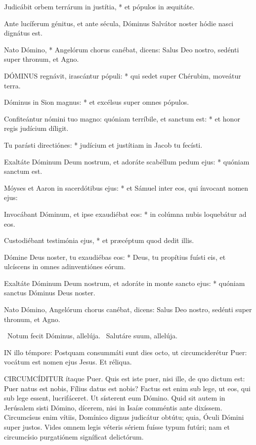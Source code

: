 Judicábit orbem terrárum in justítia, * et pópulos in æquitáte.

 Ante lucíferum génitus, et ante sécula, Dóminus Salvátor noster hódie nasci dignátus est.

 Nato Dómino, * Angelórum chorus canébat, dicens: Salus Deo nostro, sedénti super thronum, et Agno.


\lettrine[lines=2]{D}{ÓMINUS} regnávit, irascántur pópuli: * qui sedet super Chérubim, moveátur terra.

Dóminus in Sion magnus: * et excélsus super omnes pópulos.

Confiteántur nómini tuo magno: quóniam terríbile, et sanctum est: * et honor regis judícium díligit.

Tu parásti directiónes: * judícium et justítiam in Jacob tu fecísti.

Exaltáte Dóminum Deum nostrum, et adoráte scabéllum pedum ejus: * quóniam sanctum est.

Móyses et Aaron in sacerdótibus ejus: * et Sámuel inter eos, qui ínvocant nomen ejus:

Invocábant Dóminum, et ipse exaudiébat eos: * in colúmna nubis loquebátur ad eos.

Custodiébant testimónia ejus, * et præcéptum quod dedit illis.

Dómine Deus noster, tu exaudiébas eos: * Deus, tu propítius fuísti eis, et ulcíscens in omnes adinventiónes eórum.

Exaltáte Dóminum Deum nostrum, et adoráte in monte sancto ejus: * quóniam sanctus Dóminus Deus noster.

 Nato Dómino, Angelórum chorus canébat, dicens: Salus Deo nostro, sedénti super thronum, et Agno.

\V\ Notum fecit Dóminus, allelúja. \R\ Salutáre suum, allelúja.



\lettrine[lines=2]{I}{N} illo témpore: Postquam consummáti sunt dies octo, ut circumciderétur Puer: vocátum est nomen ejus Jesus. Et réliqua.



\lettrine[lines=2]{C}{IRCUMCÍDITUR} ítaque Puer. Quis est iste puer, nisi ille, de quo dictum est: Puer natus est nobis, Fílius datus est nobis? Factus est enim sub lege, ut eos, qui sub lege essent, lucrifáceret. Ut sísterent eum Dómino. Quid sit autem in Jerúsalem sisti Dómino, dícerem, nisi in Isaíæ comméntis ante dixíssem. Circumcísus enim vítiis, Domínico dignus judicátur obtútu; quia, Óculi Dómini super justos. Vides omnem legis véteris sériem fuísse typum futúri; nam et circumcísio purgatiónem signíficat delictórum.

